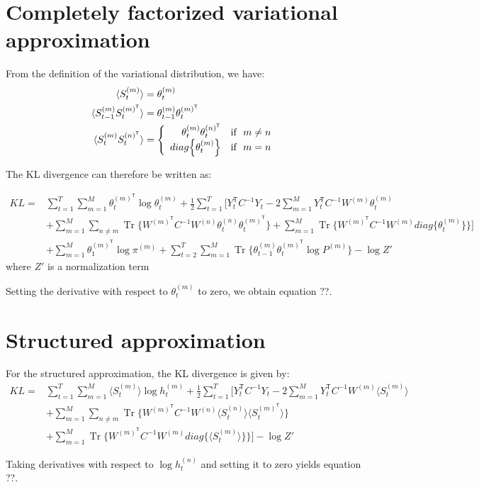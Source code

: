 \documentclass{article}
\DeclareMathOperator{\Tr}{Tr}
\begin{document}
\section{Completely factorized variational approximation}

From the definition of the variational distribution, we have:
\begin{align*}
\langle S_t^{(m)} \rangle &= \theta_t^{(m)} \\
\langle S_{t-1}^{(m)} S_t^{(m)^\mathsf{T}} \rangle &= \theta_{t-1}^{(m)} \theta_t^{(m)^\mathsf{T}} \\
\langle S_t^{(m)} S_t^{(n)^\mathsf{T}} \rangle &= \left\{
  \begin{array}{rcr}
    \theta_{t}^{(m)} \theta_t^{(n)^\mathsf{T}} \quad \textnormal{if} \ \ m \ne n \\
    diag\Big\{\theta_t^{(m)}\Big\} \quad \textnormal{if} \ \ m = n \\
  \end{array}
\right.
\end{align*}

The KL divergence can therefore be written as:

\begin{align*}
KL = &\sum_{t=1}^T \sum_{m=1}^M \theta_t^{(m)^\mathsf{T}} \log \theta_t^{(m)} + \frac{1}{2} \sum_{t=1}^T \Bigg[ Y_t^\mathsf{T} C^{-1} Y_t - 2 \sum_{m=1}^M Y_t^\mathsf{T} C^{-1} W^{(m)} \theta_t^{(m)} \\
&+ \sum_{m=1}^M \sum_{n \ne m} \Tr\bigg\{ W^{(m)^\mathsf{T}} C^{-1} W^{(n)} \theta_t^{(n)} \theta_t^{(m)^\mathsf{T}} \bigg\} + \sum_{m=1}^M \Tr\bigg\{ W^{(m)^\mathsf{T}} C^{-1} W^{(m)} diag\Big\{\theta_t^{(m)}\Big\} \bigg\} \Bigg] \\
&+ \sum_{m=1}^M \theta_1^{(m)^\mathsf{T}} \log \pi^{(m)} + \sum_{t=2}^T \sum_{m=1}^M \Tr\bigg\{ \theta_{t-1}^{(m)} \theta_t^{(m)^\mathsf{T}} \log P^{(m)} \bigg\} - \log Z'
\end{align*}
where $Z'$ is a normalization term

Setting the derivative with respect to $\theta_t^{(m)}$ to zero, we obtain equation ??.

\section{Structured approximation}

For the structured approximation, the KL divergence is given by:
\begin{align*}
KL = &\sum_{t=1}^T \sum_{m=1}^M \langle S_t^{(m)} \rangle \log h_t^{(m)} + \frac{1}{2} \sum_{t=1}^T \Bigg[ Y_t^\mathsf{T} C^{-1} Y_t - 2 \sum_{m=1}^M Y_t^\mathsf{T} C^{-1} W^{(m)} \langle S_t^{(m)} \rangle \\
&+ \sum_{m=1}^M \sum_{n \ne m} \Tr\bigg\{ W^{(m)^\mathsf{T}} C^{-1} W^{(n)} \langle S_t^{(n)} \rangle \langle S_t^{(m)^\mathsf{T}} \rangle \bigg\} \\
&+ \sum_{m=1}^M \Tr\bigg\{ W^{(m)^\mathsf{T}} C^{-1} W^{(m)} diag\Big\{\langle S_t^{(m)} \rangle\Big\} \bigg\} \Bigg] - \log Z'
\end{align*}

Taking derivatives with respect to $\log h_t^{(n)}$ and setting it to zero yields equation ??.
\end{document}
